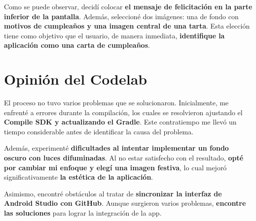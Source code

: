 \documentclass[a4paper]{article}
\begin{document}
    Como se puede observar, decidí colocar \textbf{el mensaje de felicitación en la parte inferior de la pantalla}. Además, seleccioné dos imágenes: una de fondo con \textbf{motivos de cumpleaños y una imagen central de una tarta}. Esta elección tiene como objetivo que el usuario, de manera inmediata, \textbf{identifique la aplicación como una carta de cumpleaños}.

    \section{Opinión del Codelab}
    El proceso no tuvo varios problemas que se solucionaron. Inicialmente, me enfrenté a errores durante la compilación, los cuales se resolvieron ajustando el \textbf{Compile SDK y actualizando el Gradle}. Este contratiempo me llevó un tiempo considerable antes de identificar la causa del problema.\vspace{0.3cm}

    Además, experimenté \textbf{dificultades al intentar implementar un fondo oscuro con luces difuminadas}. Al no estar satisfecho con el resultado, \textbf{opté por cambiar mi enfoque y elegí una imagen festiva}, lo cual mejoró significativamente \textbf{la estética de la aplicación}.\vspace{0.3cm}
    
    Asimismo, encontré obstáculos al tratar de \textbf{sincronizar la interfaz de Android Studio con GitHub}. Aunque surgieron varios problemas, \textbf{encontre las soluciones} para lograr la integración de la app.
    
\end{document}
